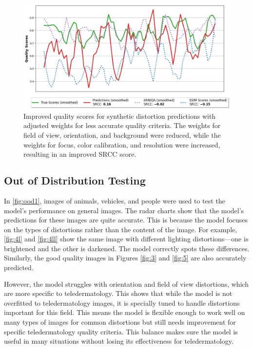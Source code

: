 \begin{figure}[ht]
    \centering
    \includegraphics[keepaspectratio,width=15cm]{img/baseline_s2.png}
    \caption{Improved quality scores for synthetic distortion predictions with adjusted weights for less accurate quality criteria. The weights for field of view, orientation, and background were reduced, while the weights for focus, color calibration, and resolution were increased, resulting in an improved SRCC score.}
    \label{fig:BA2}
\end{figure}

\clearpage
\subsection{Out of Distribution Testing}
\label{sub:6}
In \autoref{fig:ood1}, images of animals, vehicles, and people were used to test the model’s performance on general images. The radar charts show that the model’s predictions for these images are quite accurate. This is because the model focuses on the types of distortions rather than the content of the image. For example, \autoref{fig:4l} and \autoref{fig:4ll} show the same image with different lighting distortions—one is brightened and the other is darkened. The model correctly spots these differences. Similarly, the good quality images in Figures \autoref{fig:3} and \autoref{fig:5} are also accurately predicted. \par
\vspace{\baselineskip}
\noindent
However, the model struggles with orientation and field of view distortions, which are more specific to teledermatology. This shows that while the model is not overfitted to teledermatology images, it is specially tuned to handle distortions important for this field. This means the model is flexible enough to work well on many types of images for common distortions but still needs improvement for specific teledermatology quality criteria. This balance makes sure the model is useful in many situations without losing its effectiveness for teledermatology. \par

